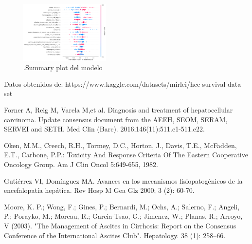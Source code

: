 \documentclass[6pt, twocolumn]{article}
\begin{document}
\begin{figure}
\centering
\includegraphics[width = 0.4\textwidth]{./exp.png}
\caption{\footnotesize \label{fig:shap}.Summary plot del modelo}
\end{figure}

\footnotesize
\begin{thebibliography}{0}

 Datos obtenidos de: https://www.kaggle.com/datasets/mirlei/hcc-survival-data-set

 Forner A, Reig M, Varela M,et al. Diagnosis and treatment of hepatocellular carcinoma. Update consensus document from the AEEH, SEOM, SERAM, SERVEI and SETH. Med Clin (Barc). 2016;146(11):511.e1-511.e22.

   Oken, M.M., Creech, R.H., Tormey, D.C., Horton, J., Davis, T.E., McFadden, E.T., Carbone, P.P.: Toxicity And Response Criteria Of The Eastern Cooperative Oncology Group. Am J Clin Oncol 5:649-655, 1982.

  Gutiérrez VI, Domínguez MA. Avances en los mecanismos fisiopatogénicos de la encefalopatía hepática. Rev Hosp M Gea Glz 2000; 3 (2): 60-70.

 Moore, K. P.; Wong, F.; Gines, P.; Bernardi, M.; Ochs, A.; Salerno, F.; Angeli, P.; Porayko, M.; Moreau, R.; Garcia-Tsao, G.; Jimenez, W.; Planas, R.; Arroyo, V (2003). "The Management of Ascites in Cirrhosis: Report on the Consensus Conference of the International Ascites Club". Hepatology. 38 (1): 258–66.
\end{thebibliography}
\end{document}
